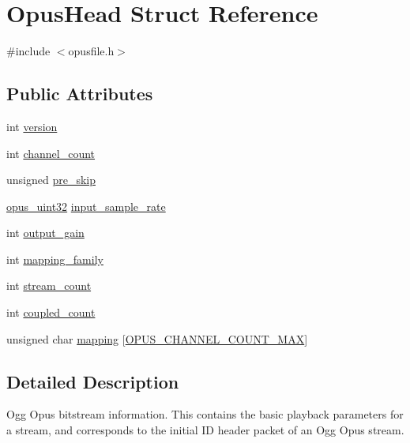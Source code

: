 \hypertarget{struct_opus_head}{}\section{Opus\+Head Struct Reference}
\label{struct_opus_head}


{\ttfamily \#include $<$opusfile.\+h$>$}

\subsection*{Public Attributes}
\begin{DoxyCompactItemize}
\item 
int \mbox{\hyperlink{struct_opus_head_a9b0e040fc6404ddc2b1fdbccf505f71e}{version}}
\item 
int \mbox{\hyperlink{struct_opus_head_ae3b3fc1a70e6b037c1d1d416fbdf2c8d}{channel\+\_\+count}}
\item 
unsigned \mbox{\hyperlink{struct_opus_head_ab448d3d3289d99f01dca8f19e878d57f}{pre\+\_\+skip}}
\item 
\mbox{\hyperlink{opus__types_8h_a643eaaadb9ef6cd44308e0299d8cd8ce}{opus\+\_\+uint32}} \mbox{\hyperlink{struct_opus_head_a73b80a913eca33d829f1667caee80d9e}{input\+\_\+sample\+\_\+rate}}
\item 
int \mbox{\hyperlink{struct_opus_head_a1f1c9e144ab05fe281f088d3e73eeab2}{output\+\_\+gain}}
\item 
int \mbox{\hyperlink{struct_opus_head_a338268b4264e059ae9ede890e6177304}{mapping\+\_\+family}}
\item 
int \mbox{\hyperlink{struct_opus_head_a241b040792d2181f3ff6fa7e9911ac40}{stream\+\_\+count}}
\item 
int \mbox{\hyperlink{struct_opus_head_a0b3e512ec24c989b0374358446197782}{coupled\+\_\+count}}
\item 
unsigned char \mbox{\hyperlink{struct_opus_head_ac6372a8a1729b034308bae47253d94b7}{mapping}} \mbox{[}\mbox{\hyperlink{group__header__info_gad6f0329582430a828244045ac85a5417}{O\+P\+U\+S\+\_\+\+C\+H\+A\+N\+N\+E\+L\+\_\+\+C\+O\+U\+N\+T\+\_\+\+M\+AX}}\mbox{]}
\end{DoxyCompactItemize}


\subsection{Detailed Description}
Ogg Opus bitstream information. This contains the basic playback parameters for a stream, and corresponds to the initial ID header packet of an Ogg Opus stream. 

